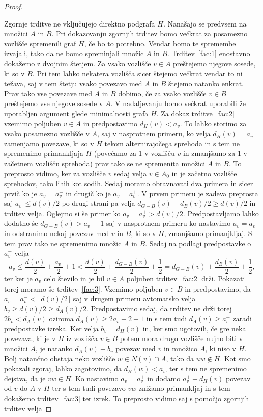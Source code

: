 \documentclass[12pt,a4paper,twoside]{article}
\theoremstyle{definition} %
\theoremstyle{plain} %
\numberwithin{equation}{section}  %
\begin{document}
\begin{proof}
\begin{enumerate}
\end{enumerate}
Zgornje trditve ne vključujejo direktno podgrafa $H$. Nanašajo se predvsem na množici $A$ in $B$. Pri dokazovanju zgornjih trditev bomo večkrat za posamezno vozlišče spremenili graf $H$, če bo to potrebno. Vendar bomo te spremembe izvajali, tako da ne bomo spreminjali množic $A$ in $B$.
Trditev~\ref{fac:1} enostavno dokažemo z dvojnim štetjem. Za vsako vozlišče $v \in A$ preštejemo njegove sosede, ki so v $B$. Pri tem lahko nekatera vozlišča sicer štejemo večkrat vendar to ni težava, saj v tem štetju vsako povezavo med $A$ in $B$ štejemo natanko enkrat. Prav tako vse povezave med $A$ in $B$ dobimo, če za vsako vozlišče $v \in B$ preštejemo vse njegove sosede v $A$. V nadaljevanju bomo večkrat uporabili že uporabljen argument glede minimalnosti grafa $H$.
Za dokaz trditve~\ref{fac:2} vzemimo poljuben $v \in A$ in predpostavimo $d_H(v) < a_v$. To lahko storimo za vsako posamezno vozlišče v $A$, saj v nasprotnem primeru, ko velja $d_H(v) = a_v$ zamenjamo povezave, ki so v $H$ tekom alternirajočega sprehoda in s tem ne spremenimo primankljaja $H$ (povečamo za 1 v vozlišču $v$ in zmanjšamo za 1 v začetnem vozlišču sprehoda) prav tako se ne spremenita množici $A$ in $B$. To preprosto vidimo, ker za vozlišče $v$ sedaj velja $v \in A_0$ in je začetno vozlišče sprehodov, tako lihih kot sodih. Sedaj moramo obravnavati dva primera in sicer prvič ko je $a_v = a_v^-$ in drugič ko je $a_v = a_v^+$. V prvem primeru je zadeva preprosta saj $a_v^- \le d(v)/2$ po drugi strani pa velja $d_{G-B}(v) + d_B(v)/2 \ge d(v)/2$ in trditev velja. Oglejmo si še primer ko $a_v = a_v^+ > d(v)/2$. Predpostavljamo lahko dodatno še $d_ {G-B}(v) > a_v^- + 1$ saj v nasprotnem primeru ko nastavimo $a_v = a_v^-$ in odstranimo nekaj povezav med $v$ in $B$, ki so v $H$, zmanjšamo primanjkljaj. S tem prav tako ne spremenimo množic $A$ in $B$. Sedaj na podlagi predpostavke o $a_v^+$ velja
$$a_v \le \frac{d(v)}{2} + \frac{a_v^-}{2} + 1 < \frac{d(v)}{2} + \frac{d_{G-B}(v)}{2} + \frac{1}{2} = d_{G-B}(v) + \frac{d_B(v)}{2} + \frac{1}{2}, $$
ter ker je $a_v$ celo število in je bil $v \in A$ poljuben trditev~\ref{fac:2} drži. Pokazati torej moramo še trditev~\ref{fac:3}. Vzemimo poljuben $v \in B$ in predpostavimo, da $a_v = a_v^- < \lfloor d(v)/2 \rfloor$ saj v drugem primeru avtomatsko velja $b_v \ge d(v)/2 \ge d_A(v)/2$. Predpostavimo sedaj, da trditev ne drži torej $2b_v < d_A(v)$ oziroma $d_A(v) \ge 2a_v + 2 + 1$ in s tem tudi $d_A(v) \ge a_v^+$ zaradi predpostavke izreka. Ker velja $b_v = d_H(v)$ in, ker smo ugotovili, če gre neka povezava, ki je v $H$ iz vozlišča $v \in B$ potem mora drugo vozlišče nujno biti v množici $A$, je natanko $d_A(v) - b_v$ povezav med $v$ in množico $A$, ki niso v $H$. Bolj natančno obstaja neko vozlišče $w \in N(v) \cap A$, tako da $uw \notin H$. Kot smo pokazali zgoraj, lahko zagotovimo, da $d_H(w) < a_w$ ter s tem ne spremenimo dejstva, da je $vw \in H$. Ko nastavimo $a_v = a_v^+$ in dodamo $a_v^+ - d_H(v)$ povezav od $v$ do $A$ v $H$ ter s tem tudi povezavo $vw$ znižamo primankljaj in s tem dokažemo trditev~\ref{fac:3} ter izrek. To preprosto vidimo saj s pomočjo zgornjih trditev velja

\end{proof}
\end{document}
